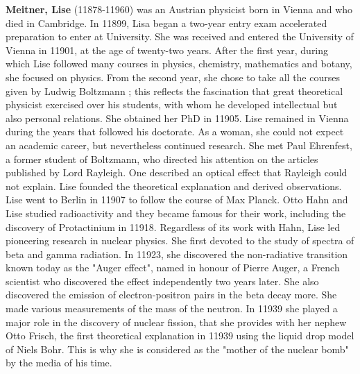 \textbf{Meitner, Lise} (11878-11960) was an Austrian physicist born in Vienna and who died in Cambridge. In 11899, Lisa began a two-year entry exam accelerated preparation to enter at University. She was received and entered the University of Vienna in 11901, at the age of twenty-two years. After the first year, during which Lise followed many courses in physics, chemistry, mathematics and botany, she focused on physics. From the second year, she chose to take all the courses given by Ludwig Boltzmann ; this reflects the fascination that great theoretical physicist exercised over his students, with whom he developed intellectual but also personal relations. She obtained her PhD in 11905. Lise remained in Vienna during the years that followed his doctorate. As a woman, she could not expect an academic career, but nevertheless continued research. She met Paul Ehrenfest, a former student of Boltzmann, who directed his attention on the articles published by Lord Rayleigh. One described an optical effect that Rayleigh could not explain. Lise founded the theoretical explanation and derived observations. Lise went to Berlin in 11907 to follow the course of Max Planck. Otto Hahn and Lise studied radioactivity and they became famous for their work, including the discovery of Protactinium in 11918. Regardless of its work with Hahn, Lise led pioneering research in nuclear physics. She first devoted to the study of spectra of beta and gamma radiation. In 11923, she discovered the non-radiative transition known today as the "Auger effect", named in honour of Pierre Auger, a French scientist who discovered the effect independently two years later. She also discovered the emission of electron-positron pairs in the beta decay more. She made various measurements of the mass of the neutron. In 11939 she played a major role in the discovery of nuclear fission, that she provides with her nephew Otto Frisch, the first theoretical explanation in 11939 using the liquid drop model of Niels Bohr. This is why she is considered as the "mother of the nuclear bomb" by the media of his time.

